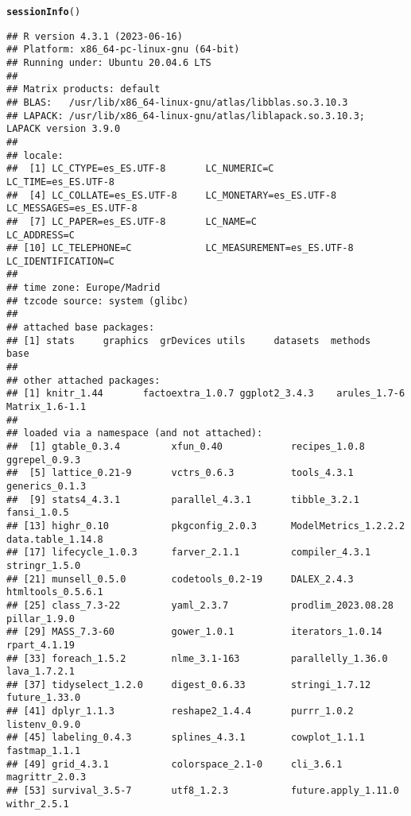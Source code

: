\documentclass{article}\usepackage[]{graphicx}\usepackage[]{xcolor}
\makeatletter
\newcommand{\hlstd}[1]{\textcolor[rgb]{0.345,0.345,0.345}{#1}}%
\newcommand{\hlkwd}[1]{\textcolor[rgb]{0.737,0.353,0.396}{\textbf{#1}}}%
\newenvironment{kframe}{%
 \def\at@end@of@kframe{}%
 \ifinner\ifhmode%
  \def\at@end@of@kframe{\end{minipage}}%
  \begin{minipage}{\columnwidth}%
 \fi\fi%
 \def\FrameCommand##1{\hskip\@totalleftmargin \hskip-\fboxsep
 \colorbox{shadecolor}{##1}\hskip-\fboxsep
     \hskip-\linewidth \hskip-\@totalleftmargin \hskip\columnwidth}%
 \MakeFramed {\advance\hsize-\width
   \@totalleftmargin\z@ \linewidth\hsize
   \@setminipage}}%
 {\par\unskip\endMakeFramed%
 \at@end@of@kframe}
\newenvironment{knitrout}{}{} %
\makeatother
\begin{document}
\begin{knitrout}
\color{fgcolor}\begin{kframe}
\begin{alltt}
\hlkwd{sessionInfo}\hlstd{()}
\end{alltt}
\begin{verbatim}
## R version 4.3.1 (2023-06-16)
## Platform: x86_64-pc-linux-gnu (64-bit)
## Running under: Ubuntu 20.04.6 LTS
## 
## Matrix products: default
## BLAS:   /usr/lib/x86_64-linux-gnu/atlas/libblas.so.3.10.3 
## LAPACK: /usr/lib/x86_64-linux-gnu/atlas/liblapack.so.3.10.3;  LAPACK version 3.9.0
## 
## locale:
##  [1] LC_CTYPE=es_ES.UTF-8       LC_NUMERIC=C               LC_TIME=es_ES.UTF-8       
##  [4] LC_COLLATE=es_ES.UTF-8     LC_MONETARY=es_ES.UTF-8    LC_MESSAGES=es_ES.UTF-8   
##  [7] LC_PAPER=es_ES.UTF-8       LC_NAME=C                  LC_ADDRESS=C              
## [10] LC_TELEPHONE=C             LC_MEASUREMENT=es_ES.UTF-8 LC_IDENTIFICATION=C       
## 
## time zone: Europe/Madrid
## tzcode source: system (glibc)
## 
## attached base packages:
## [1] stats     graphics  grDevices utils     datasets  methods   base     
## 
## other attached packages:
## [1] knitr_1.44       factoextra_1.0.7 ggplot2_3.4.3    arules_1.7-6     Matrix_1.6-1.1  
## 
## loaded via a namespace (and not attached):
##  [1] gtable_0.3.4         xfun_0.40            recipes_1.0.8        ggrepel_0.9.3       
##  [5] lattice_0.21-9       vctrs_0.6.3          tools_4.3.1          generics_0.1.3      
##  [9] stats4_4.3.1         parallel_4.3.1       tibble_3.2.1         fansi_1.0.5         
## [13] highr_0.10           pkgconfig_2.0.3      ModelMetrics_1.2.2.2 data.table_1.14.8   
## [17] lifecycle_1.0.3      farver_2.1.1         compiler_4.3.1       stringr_1.5.0       
## [21] munsell_0.5.0        codetools_0.2-19     DALEX_2.4.3          htmltools_0.5.6.1   
## [25] class_7.3-22         yaml_2.3.7           prodlim_2023.08.28   pillar_1.9.0        
## [29] MASS_7.3-60          gower_1.0.1          iterators_1.0.14     rpart_4.1.19        
## [33] foreach_1.5.2        nlme_3.1-163         parallelly_1.36.0    lava_1.7.2.1        
## [37] tidyselect_1.2.0     digest_0.6.33        stringi_1.7.12       future_1.33.0       
## [41] dplyr_1.1.3          reshape2_1.4.4       purrr_1.0.2          listenv_0.9.0       
## [45] labeling_0.4.3       splines_4.3.1        cowplot_1.1.1        fastmap_1.1.1       
## [49] grid_4.3.1           colorspace_2.1-0     cli_3.6.1            magrittr_2.0.3      
## [53] survival_3.5-7       utf8_1.2.3           future.apply_1.11.0  withr_2.5.1         

\end{verbatim}
\end{kframe}
\end{knitrout}
\end{document}
